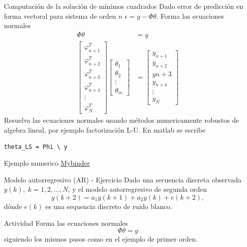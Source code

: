 \documentclass[presentation,aspectratio=169]{beamer}
\begin{document}
\begin{frame}[label={sec:orged34f6e},fragile]{Computación de la solución de mínimos cuadrados}
 Dado error de predicción en forma vectoral para sistema de orden \(n\)
\(\epsilon = y - \Phi\theta\). Forma las \alert{ecuaciones normales}
\begin{align*}
\Phi \theta &= y\\
\begin{bmatrix}\varphi_{n+1}^T\\\varphi_{n+2}^T\\\varphi_{n+3}^T\\\varphi_{n+4}^T\\\vdots\\\varphi_{N}^T\end{bmatrix} \begin{bmatrix}\theta_1\\\theta_2\\\vdots\\\theta_m\end{bmatrix} &= \begin{bmatrix}y_{n+1}\\y_{n+2}\\y{n+3}\\y_{n+4}\\\vdots\\ y_{N}\end{bmatrix}
\end{align*}
Resuelva las ecuaciones normales usando métodos numericamente robustos de algebra lineal, por ejemplo   factorización L-U. En matlab se escribe
\begin{verbatim}
theta_LS = Phi \ y
\end{verbatim}
\end{frame}

\begin{frame}[label={sec:orgb39e4a8}]{Ejemplo numerico}
\href{https://mybinder.org/v2/gh/kjartan-at-tec/mr2007-computerized-control/master?filepath=system-identification\%2Fnotebooks\%2FAR-example.ipynb}{Mybinder}
\end{frame}





\begin{frame}[label={sec:org2cabbe2}]{Modelo autorregresivo (AR) - Ejercicio}
Dado una secuencia discreta observada \(y(k), \; k=1,2,\ldots,N\), y el modelo autorregresivo de segunda orden
\[ y(k+2) = a_1y(k+1) + a_2y(k) + e(k+2),\]
dónde \(e(k)\) es una sequencia discreto de ruido blanco.

\alert{Actividad} Forma las ecuaciones normales \[ \Phi \theta = y\] siguiendo los mismos pasos como en el ejemplo de primer orden.
\end{frame}
\end{document}

